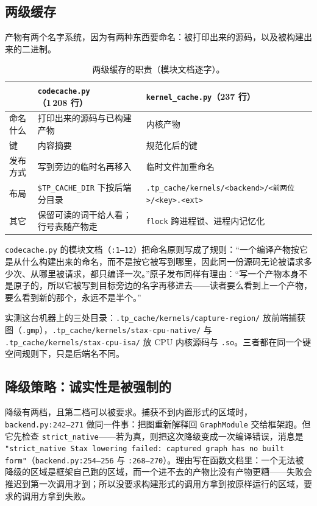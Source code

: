 \subsection{两级缓存}

产物有两个名字系统，因为有两种东西要命名：被打印出来的源码，以及被构建出来的二进制。

\begin{table}[H]
\centering
\caption{两级缓存的职责（模块文档逐字）。}
\label{tab:be:caches}
\small
\begin{tabular}{p{}p{}p{}}
\toprule
 & \texttt{codecache.py}（1\,208 行） & \texttt{kernel\_cache.py}（237 行） \\
\midrule
命名什么 & 打印出来的源码与已构建产物 & 内核产物 \\
键 & 内容摘要 & 规范化后的键 \\
发布方式 & 写到旁边的临时名再移入 & 临时文件加重命名 \\
布局 & \texttt{\$TP\_CACHE\_DIR} 下按后端分目录 & \texttt{.tp\_cache/kernels/<backend>/<前两位>/<key>.<ext>} \\
其它 & 保留可读的词干给人看；行号表随产物走 & \texttt{flock} 跨进程锁、进程内记忆化 \\
\bottomrule
\end{tabular}
\end{table}

\texttt{codecache.py} 的模块文档（\texttt{:1--12}）把命名原则写成了规则：“一个编译产物按它是从什么构建出来的命名，而不是按它被写到哪里，因此同一份源码无论被请求多少次、从哪里被请求，都只编译一次。”原子发布同样有理由：“写一个产物本身不是原子的，所以它被写到目标旁边的名字再移进去——读者要么看到上一个产物，要么看到新的那个，永远不是半个。”

实测这台机器上的三处目录：\texttt{.tp\_cache/kernels/capture-region/} 放前端捕获图（\texttt{.gmp}），\texttt{.tp\_cache/kernels/stax-cpu-native/} 与 \texttt{.tp\_cache/kernels/stax-cpu-isa/} 放 CPU 内核源码与 \texttt{.so}。三者都在同一个键空间规则下，只是后端名不同。

\subsection{降级策略：诚实性是被强制的}

降级有两档，且第二档可以被要求。捕获不到内置形式的区域时，\texttt{backend.py:242--271} 做同一件事：把图重新解释回 \texttt{GraphModule} 交给框架跑。但它先检查 \texttt{strict\_native}——若为真，则把这次降级变成一次编译错误，消息是 \texttt{"strict\_native Stax lowering failed: captured graph has no built form"}（\texttt{backend.py:254--256} 与 \texttt{:268--270}）。理由写在函数文档里：一个无法被降级的区域是框架自己跑的区域，而一个进不去的产物比没有产物更糟——失败会推迟到第一次调用才到；所以没要求构建形式的调用方拿到按原样运行的区域，要求的调用方拿到失败。

